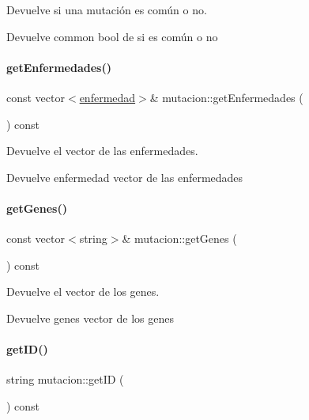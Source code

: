 Devuelve si una mutación es común o no. 

\begin{DoxyReturn}{Devuelve}
common bool de si es común o no 
\end{DoxyReturn}
\hypertarget{classmutacion_adf4c260fe49a9cc152bfe4be855304e4}{}\label{classmutacion_adf4c260fe49a9cc152bfe4be855304e4} 
\paragraph{\texorpdfstring{get\+Enfermedades()}{getEnfermedades()}}
{\footnotesize\ttfamily const vector$<$\hyperlink{classenfermedad}{enfermedad}$>$\& mutacion\+::get\+Enfermedades (\begin{DoxyParamCaption}{ }\end{DoxyParamCaption}) const}



Devuelve el vector de las enfermedades. 

\begin{DoxyReturn}{Devuelve}
enfermedad vector de las enfermedades 
\end{DoxyReturn}
\hypertarget{classmutacion_ac5e49b51d205e1de51ea8a4e405405c1}{}\label{classmutacion_ac5e49b51d205e1de51ea8a4e405405c1} 
\paragraph{\texorpdfstring{get\+Genes()}{getGenes()}}
{\footnotesize\ttfamily const vector$<$string$>$\& mutacion\+::get\+Genes (\begin{DoxyParamCaption}{ }\end{DoxyParamCaption}) const}



Devuelve el vector de los genes. 

\begin{DoxyReturn}{Devuelve}
genes vector de los genes 
\end{DoxyReturn}
\hypertarget{classmutacion_a81a090846e289f5b04cca22df458fbd2}{}\label{classmutacion_a81a090846e289f5b04cca22df458fbd2} 
\paragraph{\texorpdfstring{get\+I\+D()}{getID()}}
{\footnotesize\ttfamily string mutacion\+::get\+ID (\begin{DoxyParamCaption}{ }\end{DoxyParamCaption}) const}



